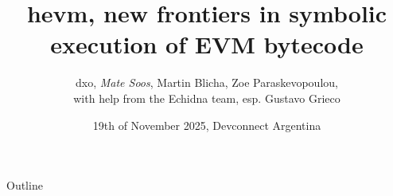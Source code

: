\documentclass[aspectratio=169]{beamer}
\title[hevm]{
hevm, new frontiers in symbolic execution of EVM bytecode}
\author[dxo, Soos, Blicha, Paraskevopoulou]
{dxo, \emph{Mate Soos}, Martin Blicha, Zoe Paraskevopoulou,\\
    with help from the Echidna team, esp. Gustavo Grieco
}
\institute[Argot]{\large Argot Collective (\url{https://argot.org})}
\date{19th of November 2025, Devconnect Argentina}
\begin{document}
\begin{frame}
    \titlepage
\end{frame}


\begin{frame}{Outline}
    \tableofcontents
\end{frame}


\end{document}
